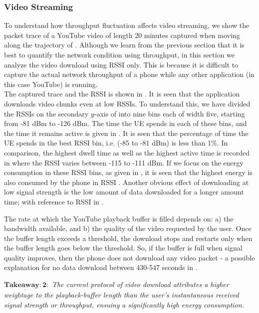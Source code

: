 \subsubsection{Video Streaming}\label{sec:chap03s3:vstreaming}
To understand how throughput fluctuation affects video streaming,
we show the packet trace of a YouTube video of length 20 minutes captured when moving along the trajectory of \fig{\ref{fig:chap03s3:technology_with_traj}}.  Although we learn from the previous section that it is best to quantify the network condition using throughput, in this section we analyze the video download using \ac{RSSI} only. This is because it is difficult to capture the actual network throughput of a phone while any other application (in this case YouTube) is running.\\
\indent The  captured trace and the \ac{RSSI}  is shown in \fig{\ref{fig:chap03s3:pcap_RSSI}}. It is seen that the application downloads video chunks even at low \acp{RSSI}. To understand this, we have divided the \acp{RSSI} on the secondary $y$-axis of \fig{\ref{fig:chap03s3:pcap_RSSI}} into nine bins each of width five, starting from -81 dBm to -126 dBm. The time the \ac{UE} spends in each of these bins, and the time it remains active is given in \fig{\ref{fig:chap03s3:vid_time}}. It is seen that the percentage of time the \ac{UE} spends in the best \ac{RSSI} bin, i.e.  (-85 to -81 dBm) is less than 1\%. In comparison, the highest dwell time   as well as the highest active time is recorded in  where the \ac{RSSI} varies between -115 to -111 dBm. If we focus on the energy consumption in these \ac{RSSI} bins, as given in \fig{\ref{fig:chap03s3:vid_thpt}}, it is seen that the highest energy is also consumed by the phone in \ac{RSSI} . Another obvious effect of downloading at low signal strength is the low amount of data downloaded for a longer amount time; with reference to \ac{RSSI}  in \fig{\ref{fig:chap03s3:vid_thpt}}.


\indent The rate at which the YouTube playback buffer is filled depends on: a) the bandwidth available, and b) the quality of the video requested by the user. Once the buffer length exceeds a threshold, the download stops and restarts only when the buffer length goes below the threshold. So, if the buffer is full when signal quality improves, then the phone does not download any video packet - a possible explanation for no data download between  430-547 seconds in \fig{\ref{fig:chap03s3:pcap_RSSI}}.


$\mathrm{\mathbf{\underline{Takeaway:2}}}:$ \textit{The current protocol of  video download attributes a higher weightage to the playback-buffer length than the user's instantaneous received signal strength or throughput, ensuing a significantly high energy consumption.}\\
